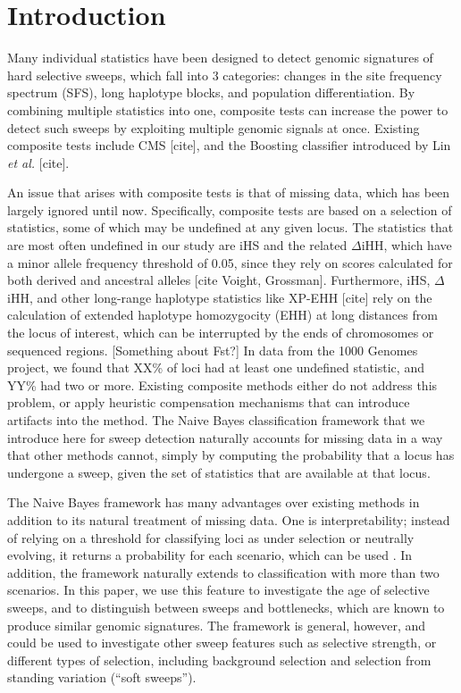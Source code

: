 \documentclass{article}
\begin{document}
\section{Introduction}
Many individual statistics have been designed to detect genomic signatures of hard selective sweeps, which fall into 3 categories: changes in the site frequency spectrum (SFS), long haplotype blocks, and population differentiation. By combining multiple statistics into one, composite tests can increase the power to detect such sweeps by exploiting multiple genomic signals at once. Existing composite tests include CMS [cite], and the Boosting classifier introduced by Lin {\it et al.} [cite].

An issue that arises with composite tests is that of missing data, which has been largely ignored until now. Specifically, composite tests are based on a selection of statistics, some of which may be undefined at any given locus. The statistics that are most often undefined in our study are iHS and the related $\Delta$iHH, which have a minor allele frequency threshold of 0.05, since they rely on scores calculated for both derived and ancestral alleles [cite Voight, Grossman]. Furthermore, iHS, $\Delta$iHH, and other long-range haplotype statistics like XP-EHH [cite] rely on the calculation of extended haplotype homozygocity (EHH) at long distances from the locus of interest, which can be interrupted by the ends of chromosomes or sequenced regions. [Something about Fst?] In data from the 1000 Genomes project, we found that XX\% of loci had at least one undefined statistic, and YY\% had two or more. Existing composite methods either do not address this problem, or apply heuristic compensation mechanisms that can introduce artifacts into the method. The Naive Bayes classification framework that we introduce here for sweep detection naturally accounts for missing data in a way that other methods cannot, simply by computing the probability that a locus has undergone a sweep, given the set of statistics that are available at that locus.

The Naive Bayes framework has many advantages over existing methods in addition to its natural treatment of missing data. One is interpretability; instead of relying on a threshold for classifying loci as under selection or neutrally evolving, it returns a probability for each scenario, which can be used . In addition, the framework naturally extends to classification with more than two scenarios. In this paper, we use this feature to investigate the age of selective sweeps, and to distinguish between sweeps and bottlenecks, which are known to produce similar genomic signatures. The framework is general, however, and could be used to investigate other sweep features such as selective strength, or different types of selection, including background selection and selection from standing variation (``soft sweeps'').
\end{document}
